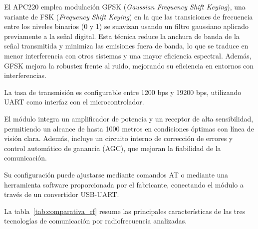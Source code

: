 \begin{itemize}
    El APC220 emplea modulación GFSK (\emph{Gaussian Frequency Shift Keying}), una variante de FSK (\emph{Frequency Shift Keying}) en la que las transiciones de frecuencia entre los niveles binarios (0 y 1) se suavizan usando un filtro gaussiano aplicado previamente a la señal digital.
    Esta técnica reduce la anchura de banda de la señal transmitida y minimiza las emisiones fuera de banda, lo que se traduce en menor interferencia con otros sistemas y una mayor eficiencia espectral.
    Además, GFSK mejora la robustez frente al ruido, mejorando su eficiencia en entornos con interferencias.

    La tasa de transmisión es configurable entre 1200 bps y 19200 bps, utilizando UART como interfaz con el microcontrolador.

    El módulo integra un amplificador de potencia y un receptor de alta sensibilidad, permitiendo un alcance de hasta 1000 metros en condiciones óptimas con línea de visión clara.
    Además, incluye un circuito interno de corrección de errores y control automático de ganancia (AGC), que mejoran la fiabilidad de la comunicación.

    Su configuración puede ajustarse mediante comandos AT o mediante una herramienta software proporcionada por el fabricante, conectando el módulo a través de un convertidor USB-UART.
\end{itemize}
La tabla~\ref{tab:comparativa_rf} resume las principales características de las tres tecnologías de comunicación por radiofrecuencia analizadas.

